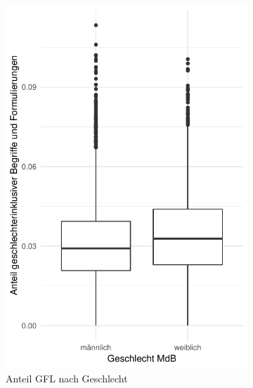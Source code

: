 \documentclass[12pt, 
    twoside=false, 
    bibliography=totoc, 
    numbers=endperiod, 
    headings=normal, 
    toc=chapterentrydotfill
    ]{scrbook}
\begin{document}
\begin{figure}[H]
    \centering
    \begin{subfigure}{.5\textwidth}
      \centering
      \includegraphics[width=.9\linewidth]{document/images/boxplot_gfl.pdf}
      \caption{Anteil GFL nach Geschlecht}
      \label{fig:boxplot_gfl_geschlecht}
    \end{subfigure}%
    \begin{subfigure}{.5\textwidth}
      \centering

\end{subfigure}
\end{figure}
\end{document}
